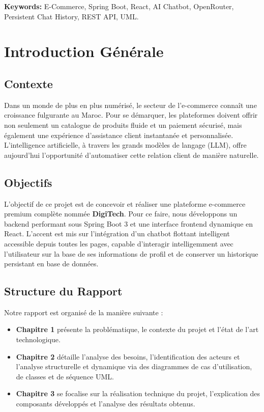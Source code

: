 \documentclass[12pt,a4paper,oneside]{report}
\begin{document}
\vspace{1.5cm}
\noindent\textbf{Keywords:} E-Commerce, Spring Boot, React, AI Chatbot, OpenRouter, Persistent Chat History, REST API, UML.

\tableofcontents

\chapter*{Introduction Générale}

\section*{Contexte}
Dans un monde de plus en plus numérisé, le secteur de l'e-commerce connaît une croissance fulgurante au Maroc. Pour se démarquer, les plateformes doivent offrir non seulement un catalogue de produits fluide et un paiement sécurisé, mais également une expérience d'assistance client instantanée et personnalisée. L'intelligence artificielle, à travers les grands modèles de langage (LLM), offre aujourd'hui l'opportunité d'automatiser cette relation client de manière naturelle.

\section*{Objectifs}
L'objectif de ce projet est de concevoir et réaliser une plateforme e-commerce premium complète nommée \textbf{DigiTech}. Pour ce faire, nous développons un backend performant sous Spring Boot 3 et une interface frontend dynamique en React. L'accent est mis sur l'intégration d'un chatbot flottant intelligent accessible depuis toutes les pages, capable d'interagir intelligemment avec l'utilisateur sur la base de ses informations de profil et de conserver un historique persistant en base de données.

\section*{Structure du Rapport}
Notre rapport est organisé de la manière suivante :
\begin{itemize}
    \item \textbf{Chapitre 1} présente la problématique, le contexte du projet et l'état de l'art technologique.
    \item \textbf{Chapitre 2} détaille l'analyse des besoins, l'identification des acteurs et l'analyse structurelle et dynamique via des diagrammes de cas d'utilisation, de classes et de séquence UML.
    \item \textbf{Chapitre 3} se focalise sur la réalisation technique du projet, l'explication des composants développés et l'analyse des résultats obtenus.
\end{itemize}
\end{document}
